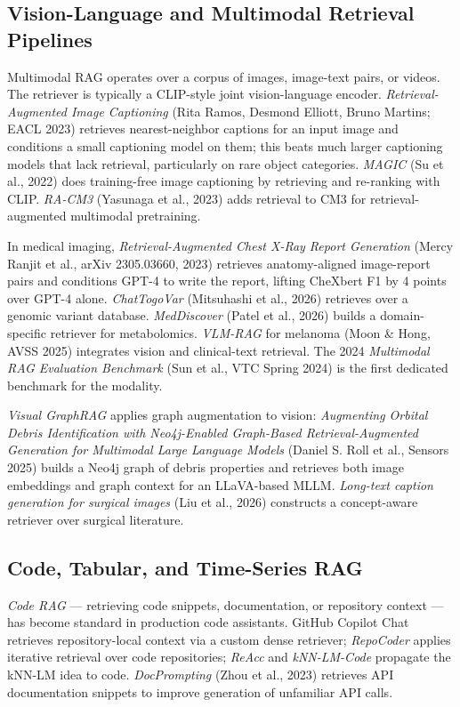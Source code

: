\documentclass{article}
\begin{document}
\subsection{Vision-Language and Multimodal Retrieval Pipelines}\label{vision-language-and-multimodal-retrieval-pipelines}

Multimodal RAG operates over a corpus of images, image-text pairs, or videos. The retriever is typically a CLIP-style joint vision-language encoder. \emph{Retrieval-Augmented Image Captioning} (Rita Ramos, Desmond Elliott, Bruno Martins; EACL 2023) retrieves nearest-neighbor captions for an input image and conditions a small captioning model on them; this beats much larger captioning models that lack retrieval, particularly on rare object categories. \emph{MAGIC} (Su et al., 2022) does training-free image captioning by retrieving and re-ranking with CLIP. \emph{RA-CM3} (Yasunaga et al., 2023) adds retrieval to CM3 for retrieval-augmented multimodal pretraining.

In medical imaging, \emph{Retrieval-Augmented Chest X-Ray Report Generation} (Mercy Ranjit et al., arXiv 2305.03660, 2023) retrieves anatomy-aligned image-report pairs and conditions GPT-4 to write the report, lifting CheXbert F1 by 4 points over GPT-4 alone. \emph{ChatTogoVar} (Mitsuhashi et al., 2026) retrieves over a genomic variant database. \emph{MedDiscover} (Patel et al., 2026) builds a domain-specific retriever for metabolomics. \emph{VLM-RAG} for melanoma (Moon \& Hong, AVSS 2025) integrates vision and clinical-text retrieval. The 2024 \emph{Multimodal RAG Evaluation Benchmark} (Sun et al., VTC Spring 2024) is the first dedicated benchmark for the modality.

\emph{Visual GraphRAG} applies graph augmentation to vision: \emph{Augmenting Orbital Debris Identification with Neo4j-Enabled Graph-Based Retrieval-Augmented Generation for Multimodal Large Language Models} (Daniel S. Roll et al., Sensors 2025) builds a Neo4j graph of debris properties and retrieves both image embeddings and graph context for an LLaVA-based MLLM. \emph{Long-text caption generation for surgical images} (Liu et al., 2026) constructs a concept-aware retriever over surgical literature.

\subsection{Code, Tabular, and Time-Series RAG}\label{code-tabular-and-time-series-rag}

\emph{Code RAG} --- retrieving code snippets, documentation, or repository context --- has become standard in production code assistants. GitHub Copilot Chat retrieves repository-local context via a custom dense retriever; \emph{RepoCoder} \citep{zhang2023miraclamultilingua} applies iterative retrieval over code repositories; \emph{ReAcc} and \emph{kNN-LM-Code} propagate the kNN-LM idea to code. \emph{DocPrompting} (Zhou et al., 2023) retrieves API documentation snippets to improve generation of unfamiliar API calls.
\end{document}
